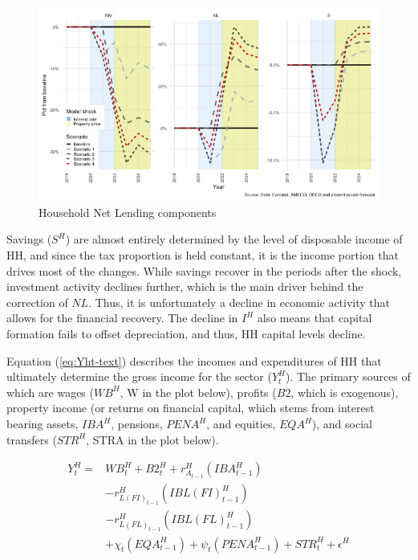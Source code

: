 \documentclass[
]{book}
\begin{document}
\begin{figure}[H]
\includegraphics[width=0.95\linewidth]{figures/fl-fi-sfc-plot-hh-indicators-nl-1} \caption{Household Net Lending components}\label{fig:fl-fi-sfc-plot-hh-indicators-nl}
\end{figure}

Savings (\(S^H\)) are almost entirely determined by the level of disposable income of HH, and since the tax proportion is held constant, it is the income portion that drives most of the changes. While savings recover in the periods after the shock, investment activity declines further, which is the main driver behind the correction of \(NL\). Thus, it is unfortunately a decline in economic activity that allows for the financial recovery. The decline in \(I^H\) also means that capital formation fails to offset depreciation, and thus, HH capital levels decline.

Equation (\ref{eq:Yht-text}) describes the incomes and expenditures of HH that ultimately determine the gross income for the sector (\(Y^H_t\)). The primary sources of which are wages (\(WB^H\), W in the plot below), profits (\(B2\), which is exogenous), property income (or returns on financial capital, which stems from interest bearing assets, \(IBA^H\), pensions, \(PENA^H\), and equities, \(EQA^H\)), and social transfers (\(STR^H\), STRA in the plot below).

\begin{equation}
\begin{split}
Y^H_t = & WB^H_t + B2^H_{t} + r^H_{A_{t-1}}(IBA^H_{t-1})\\
        & - r^H_{L(FI)_{t-1}}(IBL(FI)^H_{t-1})\\
        & - r^H_{L(FL)_{t-1}}(IBL(FL)^H_{t-1})\\
        & + \chi _t(EQA^H_{t-1}) + \psi _t(PENA^H_{t-1}) + STR^H_t + \epsilon ^H
\label{eq:Yht-text}
\end{split}
\end{equation}
\end{document}
